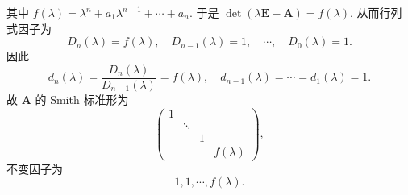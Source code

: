 \documentclass[../../main.tex]{subfiles}%
\begin{document}
\begin{solution}
其中 $f(\lambda) = \lambda^n + a_1\lambda^{n-1} + \cdots + a_n$. 于是 $\det(\lambda\boldsymbol{E} - \boldsymbol{A}) = f(\lambda)$, 从而行列式因子为
\[
D_n(\lambda) = f(\lambda), \quad D_{n-1}(\lambda) = 1, \quad \cdots, \quad D_0(\lambda) = 1.
\]
因此
\[
d_n(\lambda) = \frac{D_n(\lambda)}{D_{n-1}(\lambda)} = f(\lambda), \quad d_{n-1}(\lambda) = \cdots = d_1(\lambda) = 1.
\]
故 $\boldsymbol{A}$ 的 Smith 标准形为
\[
\begin{pmatrix} 
1 & & & \\
& \ddots & & \\
& & 1 & \\
& & & f(\lambda) 
\end{pmatrix},
\]
不变因子为
\[
1, 1, \cdots, f(\lambda).
\]

\end{solution}
\end{document}

